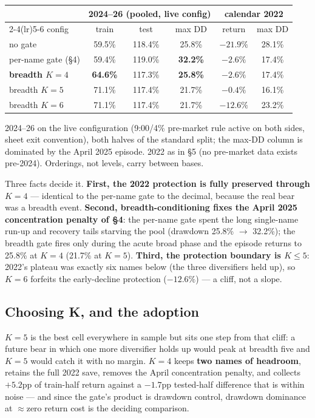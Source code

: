 \documentclass[11pt,a4paper]{article}
\newcommand{\tabnote}[1]{\begin{center}\begin{minipage}{0.92\textwidth}
  \footnotesize\color{bcgrey}#1\end{minipage}\end{center}}
\newcommand{\good}[1]{{\color{bcteal}\textbf{#1}}}
\newcommand{\bad}[1]{{\color{bcred}\textbf{#1}}}
\begin{document}
\begin{center}
\begin{tabular}{lccccc}
\toprule
 & \multicolumn{3}{c}{2024--26 (pooled, live config)} & \multicolumn{2}{c}{calendar 2022} \\
\cmidrule(lr){2-4}\cmidrule(lr){5-6}
config & train & test & max DD & return & max DD \\
\midrule
no gate            & 59.5\% & 118.4\% & 25.8\% & $-21.9\%$ & 28.1\% \\
per-name gate (\S4) & 59.4\% & 119.0\% & \bad{32.2\%} & \good{$-2.6\%$} & 17.4\% \\
\textbf{breadth $K{=}4$} & \good{64.6\%} & 117.3\% & \good{25.8\%} & \good{$-2.6\%$} & 17.4\% \\
breadth $K{=}5$    & 71.1\% & 117.4\% & 21.7\% & \good{$-0.4\%$} & 16.1\% \\
breadth $K{=}6$    & 71.1\% & 117.4\% & 21.7\% & \bad{$-12.6\%$} & 23.2\% \\
\bottomrule
\end{tabular}
\end{center}

\tabnote{2024--26 on the live configuration (9:00/4\% pre-market rule active on
both sides, sheet exit convention), both halves of the standard split; the
max-DD column is dominated by the April 2025 episode. 2022 as in \S5 (no
pre-market data exists pre-2024). Orderings, not levels, carry between bases.}

Three facts decide it. \textbf{First, the 2022 protection is fully preserved
through $K{=}4$} --- identical to the per-name gate to the decimal, because the
real bear was a breadth event. \textbf{Second, breadth-conditioning fixes the
April 2025 concentration penalty of \S4}: the per-name gate spent the long
single-name run-up and recovery tails starving the pool (drawdown 25.8\%
$\rightarrow$ 32.2\%); the breadth gate fires only during the acute broad phase
and the episode returns to 25.8\% at $K{=}4$ (21.7\% at $K{=}5$). \textbf{Third,
the protection boundary is $K \le 5$}: 2022's plateau was exactly six names
below (the three diversifiers held up), so $K{=}6$ forfeits the early-decline
protection ($-12.6\%$) --- a cliff, not a slope.

\subsection{Choosing K, and the adoption}

$K{=}5$ is the best cell everywhere in sample but sits one step from that
cliff: a future bear in which one more diversifier holds up would peak at
breadth five and $K{=}5$ would catch it with no margin. $K{=}4$ keeps
\textbf{two names of headroom}, retains the full 2022 save, removes the April
concentration penalty, and collects $+5.2$pp of train-half return against a
$-1.7$pp tested-half difference that is within noise --- and since the gate's
product is drawdown control, drawdown dominance at $\approx$zero return cost is
the deciding comparison.
\end{document}
